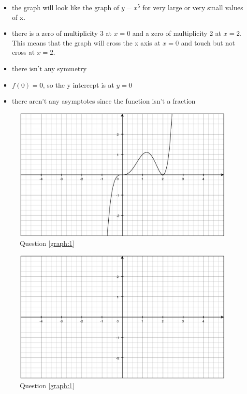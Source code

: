\documentclass[fleqn,addpoints]{exam}
\begin{document}
\begin{questions}
\begin{solution}[6 cm]
\begin{itemize}
  \item the graph will look like the graph of $y=x^5$ for very large or very small values of x.
  \item there is a zero of multiplicity 3 at $x=0$ and a zero of multiplicity 2 at $x=2$.  This means that the graph
    will cross the x axis at $x=0$ and touch but not cross at $x=2$.
  \item there isn't any symmetry
  \item $f(0) = 0$, so the y intercept is at $y=0$
  \item there aren't any asymptotes since the function isn't a fraction
\end{itemize}

\end{solution}

\ifprintanswers
\begin{figure}[H]
  \centering
  \includegraphics[scale=0.4]{graph_1_solution.eps}
  \caption*{Question \ref{graph:1}}
\end{figure}
\else
\begin{figure}[H]
  \centering
  \includegraphics[scale=0.6]{graph_1_blank.eps}
  \caption*{Question \ref{graph:1}}
\end{figure}
\fi


\end{questions}
\end{document}
